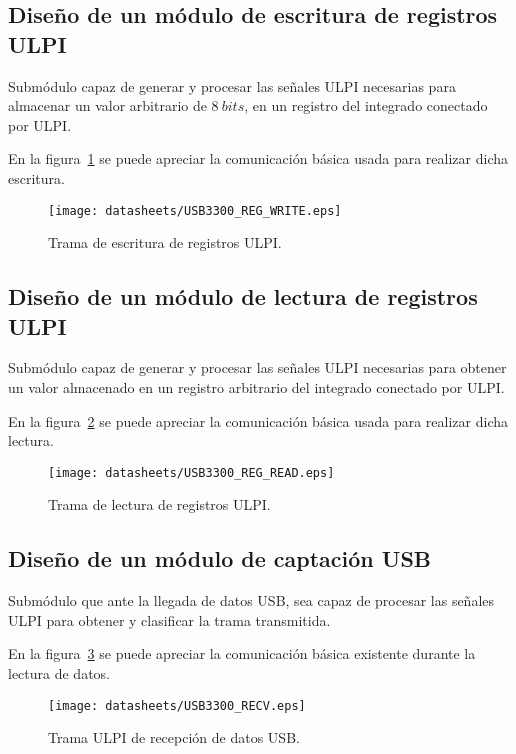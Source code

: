 \subsection{Diseño de un módulo de escritura de registros ULPI}
Submódulo capaz de generar y procesar las señales ULPI necesarias para almacenar un valor arbitrario de $8~bits$, en un registro del integrado conectado por ULPI.

En la figura~\ref{fig:ULPI_REG_WRITE} se puede apreciar la comunicación básica usada para realizar dicha escritura.
\begin{figure}[hbt]
    \centering
    \texttt{[image: datasheets/USB3300\_REG\_WRITE.eps]}
    \caption{Trama de escritura de registros ULPI.}
    \label{fig:ULPI_REG_WRITE}
\end{figure}

\subsection{Diseño de un módulo de lectura de registros ULPI}
Submódulo capaz de generar y procesar las señales ULPI necesarias para obtener un valor almacenado en un registro arbitrario del integrado conectado por ULPI.

En la figura~\ref{fig:ULPI_REG_READ} se puede apreciar la comunicación básica usada para realizar dicha lectura.
\begin{figure}[hbt]
    \centering
    \texttt{[image: datasheets/USB3300\_REG\_READ.eps]}
    \caption{Trama de lectura de registros ULPI.}
    \label{fig:ULPI_REG_READ}
\end{figure}

\subsection{Diseño de un módulo de captación USB}
Submódulo que ante la llegada de datos USB, sea capaz de procesar las señales ULPI para obtener y clasificar la trama transmitida.

En la figura~\ref{fig:ULPI_RECV} se puede apreciar la comunicación básica existente durante la lectura de datos.
\begin{figure}[hbt]
    \centering
    \texttt{[image: datasheets/USB3300\_RECV.eps]}
    \caption{Trama ULPI de recepción de datos USB.}
    \label{fig:ULPI_RECV}
\end{figure}



